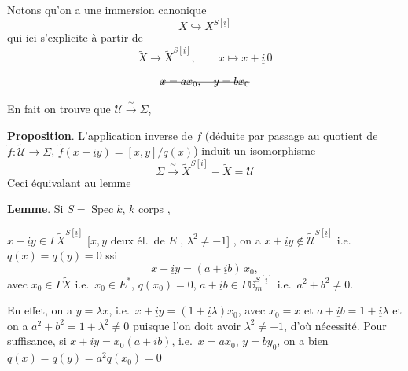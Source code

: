 \documentclass[11pt,a4paper]{article}
\begin{document}
Notons qu'on a une immersion canonique
\[
X\hookrightarrow X^{S[\underline{i}]}
\]
qui ici s'explicite à partir de
\[
\widetilde{X}\longrightarrow\widetilde{X}^{S[\underline{i}]},\qquad x\longmapsto x+\underline{i}\,0
\]

  
\[
\text{\struck{$x=ax_0,\quad y=bx_0$}}
\]

En fait on trouve que $\mathcal{U}\xrightarrow{\ \sim\ }\Sigma$,

\textbf{Proposition}. L'application inverse de $f$ (déduite par passage au quotient de $\tilde f:\widetilde{\mathcal{U}}\to\Sigma$, $\tilde f(x+\underline{i}y)=[x,y]/q(x)$) induit un isomorphisme
\[
\boxed{\ \Sigma\xrightarrow{\ \sim\ }\widetilde{X}^{S[\underline{i}]}-\widetilde{X}=\mathcal{U}\ }
\]
Ceci équivalant au lemme

\textbf{Lemme}. Si $S=\operatorname{Spec}k$, $k$ corps , \ill{} \ill{} \ill{} \struck{\ill{}} \add{\ill{} \ill{} \ill{}}

$x+\underline{i}y\in\Gamma\widetilde{X}^{S[\underline{i}]}$ [$x,y$ deux él.\ de $E$   ,  $\lambda^2\neq-1$] \struck{\ill{}}, on a $x+\underline{i}y\notin\widetilde{\mathcal{U}}^{S[\underline{i}]}$ i.e.\ $q(x)=q(y)=0$ ssi
\[
x+\underline{i}y=(a+\underline{i}b)\,x_0,
\]
avec $x_0\in\Gamma\widetilde{X}$ i.e.\ $x_0\in E^{*}$, $q(x_0)=0$, \struck{\ill{}} $a+\underline{i}b\in\Gamma\mathbb{G}_m^{S[\underline{i}]}$ i.e.\ $a^2+b^2\neq 0$.

En effet,  on a $y=\lambda x$, i.e.\ $x+\underline{i}y=(1+\underline{i}\lambda)x_0$, avec $x_0=x$ et $a+\underline{i}b=1+\underline{i}\lambda$ et on a $a^2+b^2=1+\lambda^2\neq 0$ puisque l'on doit avoir $\lambda^2\neq -1$, d'où nécessité. Pour suffisance, si $x+\underline{i}y=x_0(a+\underline{i}b)$, i.e.\ $x=ax_0$, $y=by_0$, on a bien \ill{} $q(x)=q(y)=a^2q(x_0)=0$ \ill{}
\end{document}
